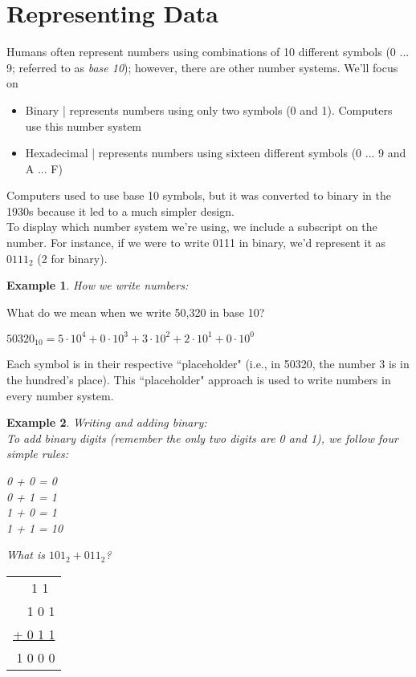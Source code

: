 \documentclass{report}
\newtheorem{ex}{Example}[section]
\begin{document}
\section{Representing Data}
Humans often represent numbers using combinations of 10 different symbols (0 ... 9; referred to as \textit{base 10}); however, there are other number systems. We'll focus on
\begin{itemize}
\item Binary | represents numbers using only two symbols (0 and 1). Computers use this number system
\item Hexadecimal | represents numbers using sixteen different symbols (0 ... 9 and A ... F)
\end{itemize}
Computers used to use base 10 symbols, but it was converted to binary in the 1930s because it led to a much simpler design.\\
To display which number system we're using, we include a subscript on the number. For instance, if we were to write 0111 in binary, we'd represent it as $0111_2$ (2 for binary).
\begin{ex}
How we write numbers:
\end{ex}
\noindent What do we mean when we write 50,320 in base 10?
\begin{center}
$50320_{10} = 5 \cdot 10^4 + 0 \cdot 10^3 + 3 \cdot 10^2 + 2 \cdot 10^1 + 0 \cdot 10^0$
\end{center}
Each symbol is in their respective ``placeholder" (i.e., in 50320, the number 3 is in the hundred's place). This ``placeholder" approach is used to write numbers in every number system.
\begin{ex}
Writing and adding binary:\\
To add binary digits (remember the only two digits are 0 and 1), we follow four simple rules:
\begin{center}
0 + 0 = 0 \\
0 + 1 = 1 \\
1 + 0 = 1 \\
1 + 1 = 10
\end{center}
What is $101_2 + 011_2$?
\end{ex}
\begin{center}
\begin{tabular}{ r }
\textsc{1 1} \;\,\\
1 0 1 \\
\underline{+ 0 1 1}\\
1 0 0 0
\end{tabular}
\end{center}
\end{document}
